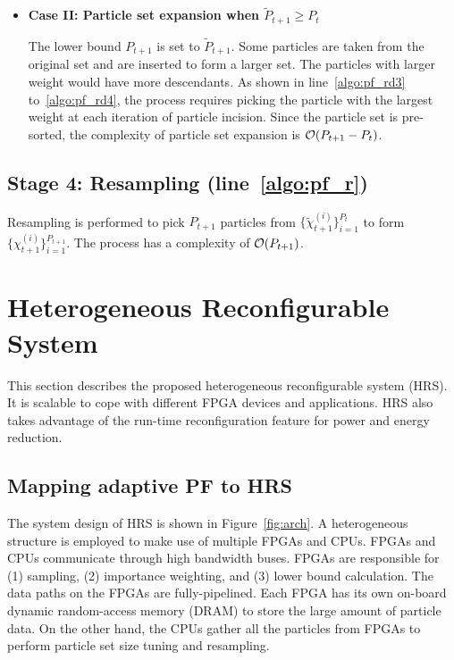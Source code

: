 \begin{itemize}
\item {\bf Case II: Particle set expansion when $\widetilde{P}_{t+1} \geq P_{t}$}

The lower bound $P_{t+1}$ is set to $\widetilde{P}_{t+1}$.
Some particles are taken from the original set and are inserted to form a larger set.
The particles with larger weight would have more descendants.
As shown in line~\ref{algo:pf_rd3} to~\ref{algo:pf_rd4}, the process requires picking the particle with the largest weight at each iteration of particle incision.
Since the particle set is pre-sorted, the complexity of particle set expansion is $\mathop{}\mathopen{}\mathcal{O}\mathopen{}\left(P_{t+1}-P_{t}\right)$.

\end{itemize}

\subsection{Stage 4: Resampling (line~\ref{algo:pf_r})}
Resampling is performed to pick $P_{t+1}$ particles from $\{\widetilde{\chi}_{t+1}^{(i)}\}^{P_t}_{i=1}$ to form $\{\chi_{t+1}^{(i)}\}^{P_{t+1}}_{i=1}$.
The process has a complexity of $\mathop{}\mathopen{}\mathcal{O}\mathopen{}\left(P_{t+1}\right)$.

\section{Heterogeneous Reconfigurable System}
\label{sec:hrs}

This section describes the proposed heterogeneous reconfigurable system (HRS).
It is scalable to cope with different FPGA devices and applications.
HRS also takes advantage of the run-time reconfiguration feature for power and energy reduction.

\subsection{Mapping adaptive PF to HRS}
\label{sec:arch}

The system design of HRS is shown in Figure~\ref{fig:arch}.
A heterogeneous structure is employed to make use of multiple FPGAs and CPUs.
FPGAs and CPUs communicate through high bandwidth buses.
FPGAs are responsible for (1) sampling, (2) importance weighting, and (3) lower bound calculation.
The data paths on the FPGAs are fully-pipelined.
Each FPGA has its own on-board dynamic random-access memory (DRAM) to store the large amount of particle data.
On the other hand, the CPUs gather all the particles from FPGAs to perform particle set size tuning and resampling.

